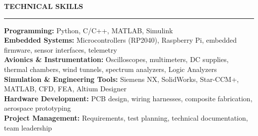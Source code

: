 \documentclass[10pt]{article}
\newcommand{\ressection}[1]{
  \vspace{0.45em}
  {\large\bfseries #1}\par
  \vspace{0.12em}\hrule\vspace{0.32em}
}
\begin{document}
\ressection{TECHNICAL SKILLS}

\textbf{Programming:} Python, C/C++, MATLAB, Simulink \\
\textbf{Embedded Systems:} Microcontrollers (RP2040), Raspberry Pi, embedded firmware, sensor interfaces, telemetry \\
\textbf{Avionics \& Instrumentation:} Oscilloscopes, multimeters, DC supplies, thermal chambers, wind tunnels, spectrum analyzers, Logic Analyzers \\
\textbf{Simulation \& Engineering Tools:} Siemens NX, SolidWorks, Star-CCM+, MATLAB, CFD, FEA, Altium Designer \\
\textbf{Hardware Development:} PCB design, wiring harnesses, composite fabrication, aerospace prototyping \\
\textbf{Project Management:} Requirements, test planning, technical documentation, team leadership
\end{document}
